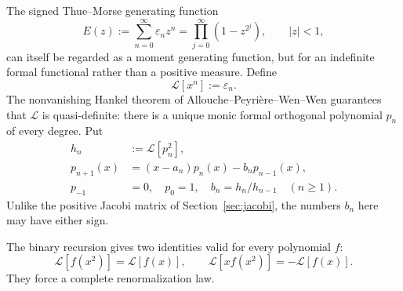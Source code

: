 \documentclass[11pt]{article}
\theoremstyle{definition}
\theoremstyle{remark}
\newcommand{\eps}{\varepsilon}
\newcommand{\cL}{\mathcal L}
\begin{document}
The signed Thue--Morse generating function
\begin{equation}
 E(z):=\sum_{n=0}^{\infty}\eps_nz^n
      =\prod_{j=0}^{\infty}(1-z^{2^j}),\qquad |z|<1,        \label{eq:E-repeat}
\end{equation}
can itself be regarded as a moment generating function, but for an indefinite formal
functional rather than a positive measure.  Define
\begin{equation}
 \cL[x^n]:=\eps_n.                                  \label{eq:L-tm}
\end{equation}
The nonvanishing Hankel theorem of Allouche--Peyri\`ere--Wen--Wen \cite{APWW,BugeaudHan} guarantees that
\(\cL\) is quasi-definite: there is a unique monic formal orthogonal polynomial
\(p_n\) of every degree.  Put
\begin{align}
 h_n&:=\cL[p_n^2],                                  \label{eq:tm-hn}\\
 p_{n+1}(x)&=(x-a_n)p_n(x)-b_np_{n-1}(x),                  \label{eq:tm-monic-rec}\\
 p_{-1}&=0,
 \quad p_0=1,
 \quad b_n=h_n/h_{n-1}\quad(n\ge1).                       \label{eq:tm-bnorm}
\end{align}
Unlike the positive Jacobi matrix of Section~\ref{sec:jacobi}, the numbers \(b_n\) here
may have either sign.

The binary recursion gives two identities valid for every polynomial \(f\):
\begin{equation}
 \cL[f(x^2)]=\cL[f(x)],
 \qquad
 \cL[xf(x^2)]=-\cL[f(x)].                    \label{eq:L-quadratic}
\end{equation}
They force a complete renormalization law.
\end{document}

